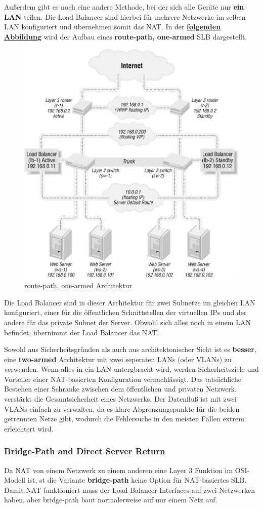 Außerdem gibt es noch eine andere Methode, bei der sich alle Geräte nur \textbf{ein LAN} teilen. Die Load Balancer sind hierbei für mehrere Netzwerke im selben LAN konfiguriert und übernehmen somit das NAT. In der \textbf{\hyperref[nat_slb_02]{folgenden Abbildung}} wird der Aufbau eines \textbf{route-path, one-armed} SLB dargestellt.
\begin{figure}[!h]
	\begin{center}
		\includegraphics[width=0.5\linewidth]{images/slb_0702}
		\caption{route-path, one-armed Architektur}
		\label{nat_slb_02}
	\end{center}
\end{figure}

Die Load Balancer sind in dieser Architektur für zwei Subnetze im gleichen LAN konfiguriert, einer für die öffentlichen Schnittstellen der virtuellen IPs und der andere für das private Subnet der Server. Obwohl sich alles noch in einem LAN befindet, übernimmt der Load Balancer das NAT.

Sowohl aus Sicherheitsgründen als auch aus architektonischer Sicht ist es \textbf{besser}, eine \textbf{two-armed} Architektur mit zwei seperaten LANs (oder VLANs) zu verwenden. Wenn alles in ein LAN untergbracht wird, werden Sicherheitsziele und Vorteiler einer NAT-basierten Konfiguration vernachlässigt. Das tatsächliche Bestehen einer Schranke zwischen dem öffentlichen und privaten Netzwerk, verstärkt die Gesamtsicherheit eines Netzwerks. Der Datenfluß ist mit zwei VLANs einfach zu verwalten, da es klare Abgrenzungspunkte für die beiden getrennten Netze gibt, wodurch die Fehlersuche in den meisten Fällen extrem erleichtert wird.
\newpage

\subsubsection{Bridge-Path and Direct Server Return}
Da NAT von einem Netzwerk zu einem anderen eine Layer 3 Funktion im  OSI-Modell ist, st die Variante \textbf{bridge-path} keine Option für NAT-basiertes SLB. Damit NAT funktioniert muss der Load Balancer Interfaces auf zwei Netzwerken haben, aber bridge-path baut normalerweise auf nur einem Netz auf.

